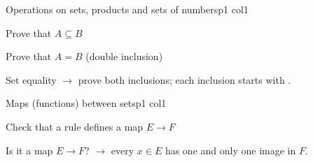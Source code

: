 \documentclass[sheet,noautoquant,noautokw]{neyvia-study}
\begin{document}
\maketitle

\begin{concept}[1.1]{Operations on sets, products and sets of numbers}{p1 col1}
\begin{definition}
\end{definition}
\begin{method}{Prove that $A\subseteq B$}
\step{$\displaystyle \cdots$}
\end{method}
\begin{method}{Prove that $A=B$ (double inclusion)}
\end{method}
\begin{reflex}
Set equality \ensuremath{\rightarrow} prove both inclusions; each inclusion starts with .
\end{reflex}
\end{concept}
\begin{concept}[1.2]{Maps (functions) between sets}{p1 col1}
\begin{definition}
\end{definition}
\begin{method}{Check that a rule defines a map $E\to F$}
\end{method}
\begin{reflex}
Is it a map $E\to F$? \ensuremath{\rightarrow} every $x\in E$ has one and only one image in $F$.
\end{reflex}
\end{concept}
\end{document}
